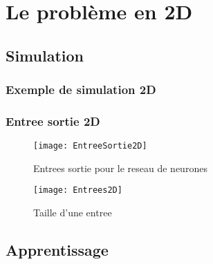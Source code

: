 

% 

\section{Le problème en 2D}

\subsection{Simulation}

\begin{frame}[fragile]
    \frametitle{Exemple de simulation 2D}
  \begin{center}
  \end{center}
\end{frame}

\begin{frame}[fragile]
    \frametitle{Entree sortie 2D}

        \begin{figure}
        \texttt{[image: EntreeSortie2D]}       
        \caption{Entrees sortie pour le reseau de neurones}
        \end{figure}
        \begin{figure}
        \texttt{[image: Entrees2D]}       
        \caption{Taille d'une entree}
        \end{figure}

\end{frame}

\subsection{Apprentissage}

